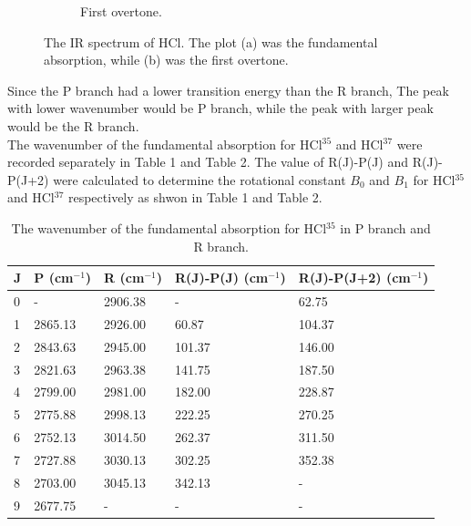 \documentclass[twocolumn]{article} %
\begin{document}
\begin{figure}[h!]
\begin{subfigure}[b]{0.95\columnwidth}
      \caption{First overtone.}
      \label{fig:sfig2}
    \end{subfigure}
    \caption{The IR spectrum of HCl. The plot (a) was the fundamental absorption, while (b) was the first overtone.}
\end{figure}

Since the P branch had a lower transition energy than the R branch, The peak  with lower wavenumber would be P branch, while the peak with larger peak would be the R branch. \\[2\baselineskip]

The wavenumber of the fundamental absorption for HCl$^{35}$ and HCl$^{37}$ were recorded separately in Table 1 and Table 2. The value of R(J)-P(J) and R(J)-P(J+2) were calculated to determine the rotational constant $B_0$ and $B_1$ for HCl$^{35}$ and HCl$^{37}$ respectively as shwon in Table 1 and Table 2.\\[1\baselineskip]

\begin{table}[h]
    \caption{The wavenumber of the fundamental absorption for HCl$^{35}$ in P branch and R branch.}
    \begin{tabular}{L{.1in}C{.7in}C{.7in}C{.7in}C{.8in}}\toprule
        J & P (cm$^{-1}$)      & R     (cm$^{-1}$)  & R(J)-P(J) (cm$^{-1}$)& R(J)-P(J+2) (cm$^{-1}$)\\ &     -   & 2906.38 &     -     & 62.75       \\
        1 & 2865.13 & 2926.00 & 60.87     & 104.37      \\
        2 & 2843.63 & 2945.00 & 101.37    & 146.00      \\
        3 & 2821.63 & 2963.38 & 141.75    & 187.50      \\
        4 & 2799.00 & 2981.00 & 182.00    & 228.87      \\
        5 & 2775.88 & 2998.13 & 222.25    & 270.25      \\
        6 & 2752.13 & 3014.50 & 262.37    & 311.50      \\
        7 & 2727.88 & 3030.13 & 302.25    & 352.38      \\
        8 & 2703.00 & 3045.13 & 342.13    &   -          \\
        9 & 2677.75 &     -   &    -      &    - \\\bottomrule
   \end{tabular}
\end{table}
\end{document}
